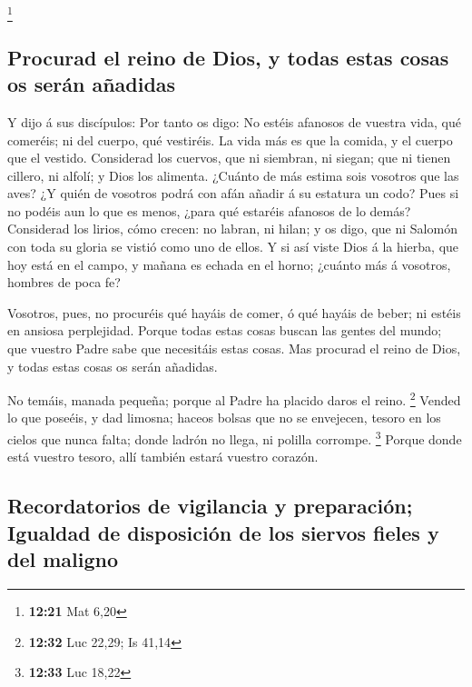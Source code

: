 \footnote{\textbf{12:21} Mat 6,20}

\hypertarget{procurad-el-reino-de-dios-y-todas-estas-cosas-os-seruxe1n-auxf1adidas}{%
\subsection{Procurad el reino de Dios, y todas estas cosas os serán
añadidas}\label{procurad-el-reino-de-dios-y-todas-estas-cosas-os-seruxe1n-auxf1adidas}}

 Y dijo á sus discípulos: Por tanto os digo: No estéis
afanosos de vuestra vida, qué comeréis; ni del cuerpo, qué vestiréis.
 La vida más es que la comida, y el cuerpo que el vestido.
 Considerad los cuervos, que ni siembran, ni siegan; que ni
tienen cillero, ni alfolí; y Dios los alimenta. ¿Cuánto de más estima
sois vosotros que las aves?  ¿Y quién de vosotros podrá con
afán añadir á su estatura un codo?  Pues si no podéis aun
lo que es menos, ¿para qué estaréis afanosos de lo demás? 
Considerad los lirios, cómo crecen: no labran, ni hilan; y os digo, que
ni Salomón con toda su gloria se vistió como uno de ellos. 
Y si así viste Dios á la hierba, que hoy está en el campo, y mañana es
echada en el horno; ¿cuánto más á vosotros, hombres de poca fe?

 Vosotros, pues, no procuréis qué hayáis de comer, ó qué
hayáis de beber; ni estéis en ansiosa perplejidad.  Porque
todas estas cosas buscan las gentes del mundo; que vuestro Padre sabe
que necesitáis estas cosas.  Mas procurad el reino de Dios,
y todas estas cosas os serán añadidas.

 No temáis, manada pequeña; porque al Padre ha placido
daros el reino. \footnote{\textbf{12:32} Luc 22,29; Is 41,14}
 Vended lo que poseéis, y dad limosna; haceos bolsas que no
se envejecen, tesoro en los cielos que nunca falta; donde ladrón no
llega, ni polilla corrompe. \footnote{\textbf{12:33} Luc 18,22}
 Porque donde está vuestro tesoro, allí también estará
vuestro corazón.

\hypertarget{recordatorios-de-vigilancia-y-preparaciuxf3n-igualdad-de-disposiciuxf3n-de-los-siervos-fieles-y-del-maligno}{%
\subsection{Recordatorios de vigilancia y preparación; Igualdad de
disposición de los siervos fieles y del
maligno}\label{recordatorios-de-vigilancia-y-preparaciuxf3n-igualdad-de-disposiciuxf3n-de-los-siervos-fieles-y-del-maligno}}

